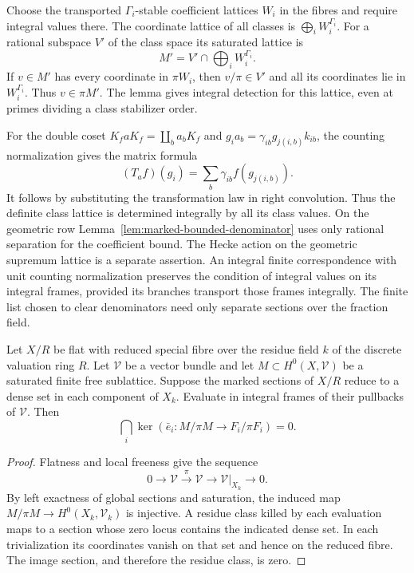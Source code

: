 Choose the transported \(\Gamma_i\)-stable coefficient lattices \(W_i\)
in the fibres and require integral values there. The coordinate lattice of
all classes is \(\bigoplus_i W_i^{\Gamma_i}\). For a rational subspace
\(V'\) of the class space its saturated lattice is
\[
  M'=V'\cap\bigoplus_i W_i^{\Gamma_i}.
\]
If \(v\in M'\) has every coordinate in \(\pi W_i\), then
\(v/\pi\in V'\) and all its coordinates lie in \(W_i^{\Gamma_i}\).
Thus \(v\in\pi M'\). The lemma gives integral detection for this
lattice, even at primes dividing a class stabilizer order.

For the double coset \(K_f aK_f=\coprod_b a_bK_f\) and
\(g_i a_b=\gamma_{ib}g_{j(i,b)}k_{ib}\), the counting normalization
gives the matrix formula
\[
        (T_a f)(g_i)=\sum_b\gamma_{ib}f(g_{j(i,b)}) .
\]
It follows by substituting the transformation law in right convolution.
Thus the definite class lattice is determined integrally by all its
class values. On the geometric row Lemma~\ref{lem:marked-bounded-denominator}
uses only rational separation for the coefficient bound. The
Hecke action on the geometric supremum lattice is a separate
assertion. An integral finite correspondence with unit counting
normalization preserves the condition of integral values on its
integral frames, provided its branches transport those frames
integrally. The finite list chosen to clear denominators need
only separate sections over the fraction field.

\begin{auxlemma}\label{lem:marked-fibre-density}
Let \(X/R\) be flat with reduced special fibre over the residue field
\(k\) of the discrete valuation ring \(R\). Let \(\mathcal V\) be a
vector bundle and let \(M\subset H^0(X,\mathcal V)\) be a saturated
finite free sublattice. Suppose the marked sections of \(X/R\) reduce
to a dense set in each component of \(X_k\). Evaluate in integral
frames of their pullbacks of \(\mathcal V\). Then
\[
            \bigcap_i\ker(\bar e_i:M/\pi M\to F_i/\pi F_i)=0.
\]
\end{auxlemma}
\begin{proof}
Flatness and local freeness give the sequence
\[
 0\longrightarrow \mathcal V\xrightarrow{\ \pi\ }
 \mathcal V\longrightarrow\mathcal V|_{X_k}\longrightarrow0 .
\]
By left exactness of global sections and saturation, the induced map
\(M/\pi M\to H^0(X_k,\mathcal V_k)\) is injective. A residue class
killed by each evaluation maps to a section whose zero locus contains
the indicated dense set. In each trivialization its coordinates vanish
on that set and hence on the reduced fibre. The image section, and
therefore the residue class, is zero.
\end{proof}

